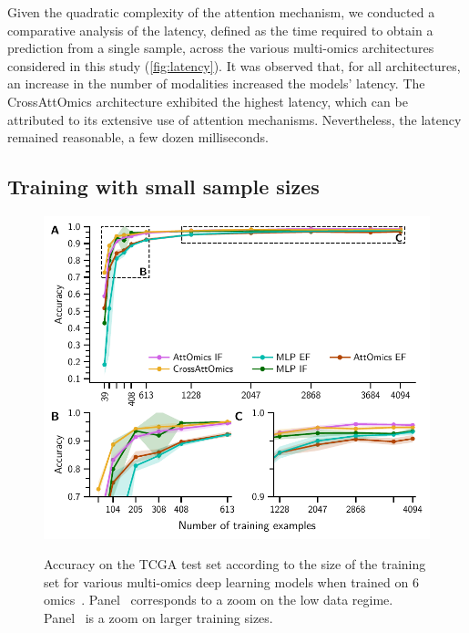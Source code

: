 \documentclass[../main.tex]{subfiles}
\begin{document}
		Given the quadratic complexity of the attention mechanism, we conducted a comparative analysis of the latency, defined as the time required to obtain a prediction from a single sample, across the various multi-omics architectures considered in this study (\cref{fig:latency}).
		It was observed that, for all architectures, an increase in the number of modalities increased the models' latency.
		The CrossAttOmics architecture exhibited the highest latency, which can be attributed to its extensive use of attention mechanisms. Nevertheless, the latency remained reasonable,  a few dozen milliseconds.

	\subsection{Training with small sample sizes}
		\begin{figure}[htbp]
			\centering
			\begin{subcaptiongroup}
				\includegraphics{limited_training_6_omics.pdf}
				\label{fig:lim_train_6_omics_A}
				\label{fig:lim_train_6_omics_B}
				\label{fig:lim_train_6_omics_C}
			\end{subcaptiongroup}
			\caption[CrossAttOmics and other architectures accuracy on the TCGA test set according to the size of the training set]{Accuracy on the TCGA test set according to the size of the training set for various multi-omics deep learning models when trained on 6 omics~. Panel~ corresponds to a zoom on the low data regime. Panel~ is a zoom on larger training sizes.}
			\label{fig:lim_train_6_omics}
		\end{figure}
\end{document}
